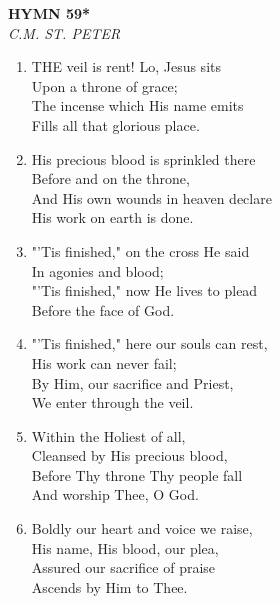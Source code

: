 \documentclass[11pt,a4paper]{article}
\begin{document}
\newpage
\begin{center}
    {\Large \textbf{HYMN 59*}}
    \\
    \textit{C.M. ST. PETER}
\end{center}
\vspace{1em}

\begin{enumerate}
    \item THE veil is rent! Lo, Jesus sits \\
        Upon a throne of grace; \\
        The incense which His name emits \\
        Fills all that glorious place.

    \item His precious blood is sprinkled there \\
        Before and on the throne, \\
        And His own wounds in heaven declare \\
        His work on earth is done.

    \item "'Tis finished," on the cross He said \\
        In agonies and blood; \\
        "'Tis finished," now He lives to plead \\
        Before the face of God.

    \item "'Tis finished," here our souls can rest, \\
        His work can never fail; \\
        By Him, our sacrifice and Priest, \\
        We enter through the veil.

    \item Within the Holiest of all, \\
        Cleansed by His precious blood, \\
        Before Thy throne Thy people fall \\
        And worship Thee, O God.

    \item Boldly our heart and voice we raise, \\
        His name, His blood, our plea, \\
        Assured our sacrifice of praise \\
        Ascends by Him to Thee.

\end{enumerate}
\end{document}
